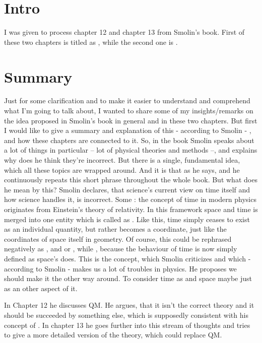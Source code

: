 \section{Intro}
I was given to process chapter 12 and chapter 13 from Smolin's book. First of these two chapters is titled as , while the second one is .

\section{Summary}
Just for some clarification and to make it easier to understand and comprehend what I'm going to talk about, I wanted to share some of my insights/remarks on the idea proposed in Smolin's book in general and in these two chapters. But first I would like to give a summary and explanation of this - according to Smolin - , and how these chapters are connected to it. \newline
So, in the book Smolin speaks about a lot of things in particular -- lot of physical theories and methods --, and explains why does he think they're incorrect. But there is a single, fundamental idea, which all these topics are wrapped around. And it is that  as he says, and he continuously repeats this short phrase throughout the whole book. But what does he mean by this? \newline
Smolin declares, that science's current view on time itself and how science handles it, is incorrect. Some : the concept of time in modern physics originates from Einstein's theory of relativity. In this framework space and time is merged into one entity which is called as . Like this, time simply ceases to exist as an individual quantity, but rather becomes a coordinate, just like the coordinates of space itself in geometry. Of course, this could be rephrased negatively as , and  or , while , because the behaviour of time is now simply defined as space's does. This is the concept, which Smolin criticizes and which - according to Smolin - makes us a lot of troubles in physics. He proposes we should make it the other way around. To consider time as  and space maybe just as an other aspect of it. \par
In Chapter 12 he discusses QM. He argues, that it isn't the correct theory and it should be succeeded by something else, which is supposedly consistent with his concept of . In chapter 13 he goes further into this stream of thoughts and tries to give a more detailed version of the theory, which could replace QM.

